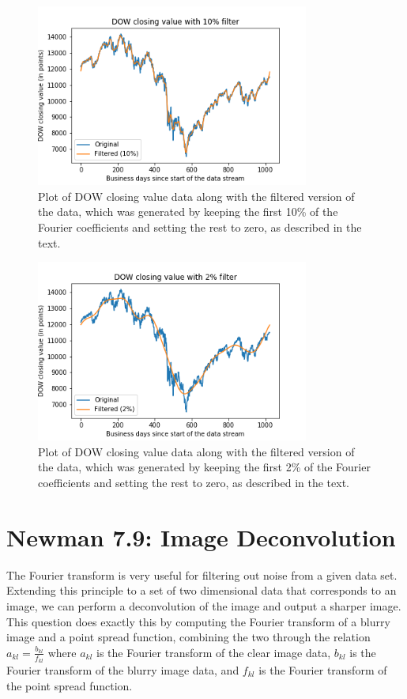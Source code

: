 \documentclass{article}
\begin{document}
\begin{figure}[H]
	\centering
	\includegraphics[width=0.8\textwidth]{../images/1b_filtered_10.png}
	\caption{Plot of DOW closing value data along with the filtered version of the data, which was generated by keeping the first 10\% of the Fourier coefficients and setting the rest to zero, as described in the text.}
	\label{fig:1b_filtered_10}
\end{figure}

\begin{figure}[H]
	\centering
	\includegraphics[width=0.8\textwidth]{../images/1b_filtered_02.png}
	\caption{Plot of DOW closing value data along with the filtered version of the data, which was generated by keeping the first 2\% of the Fourier coefficients and setting the rest to zero, as described in the text.}
	\label{fig:1b_filtered_02}
\end{figure}


\section{Newman 7.9: Image Deconvolution}
The Fourier transform is very useful for filtering out noise from a given data set. Extending this principle to a set of two dimensional data that corresponds to an image, we can perform a deconvolution of the image and output a sharper image. This question does exactly this by computing the Fourier transform of a blurry image and a point spread function, combining the two through the relation $a_{kl} = \frac{b_{kl}}{f_{kl}}$ where $a_{kl}$ is the Fourier transform of the clear image data, $b_{kl}$ is the Fourier transform of the blurry image data, and $f_{kl}$ is the Fourier transform of the point spread function.
\end{document}
